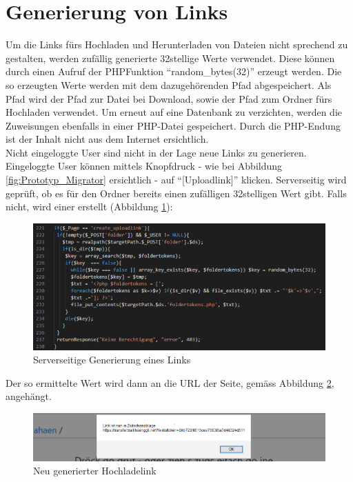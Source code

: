 \section{Generierung von Links}
Um die Links fürs Hochladen und Herunterladen von Dateien nicht sprechend zu gestalten, werden zufällig generierte 32stellige Werte verwendet.
Diese können durch einen Aufruf der PHP\-Funktion ``random\_bytes(32)'' erzeugt werden.
Die so erzeugten Werte werden mit dem dazugehörenden Pfad abgespeichert. Als Pfad wird der Pfad zur Datei bei Download, 
sowie der Pfad zum Ordner fürs Hochladen verwendet.
Um erneut auf eine Datenbank zu verzichten, werden die Zuweisungen ebenfalls in einer PHP-Datei gespeichert.
Durch die PHP-Endung ist der Inhalt nicht aus dem Internet ersichtlich.
\\
Nicht eingeloggte User sind nicht in der Lage neue Links zu generieren. 
Eingeloggte User können mittels Knopfdruck - wie bei Abbildung \ref{fig:Prototyp_Migrator} ersichtlich - auf ``[Uploadlink]'' klicken. 
Serverseitig wird geprüft, ob es für den Ordner bereits einen zufälligen 32stelligen Wert gibt. Falls nicht, wird einer erstellt (Abbildung \ref{fig:Srv_newLink}):
\begin{figure}[!h]
    \centering
    \includegraphics[width=0.9\linewidth]{content/images/prototyp_tokens.png}
    \caption{Serverseitige Generierung eines Links}
    \label{fig:Srv_newLink}
\end{figure}

\clearpage

Der so ermittelte Wert wird dann an die URL der Seite, gemäss Abbildung \ref{fig:Hochladelink_prototyp}, angehängt.
\begin{figure}[!h]
    \centering
    \includegraphics[width=1\linewidth]{content/images/prototyp_uploadtoken.png}
    \caption{Neu generierter Hochladelink}
    \label{fig:Hochladelink_prototyp}
\end{figure}

